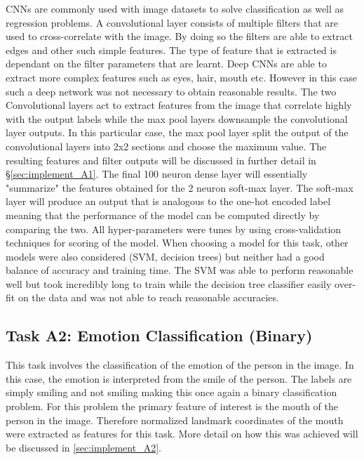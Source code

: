 \documentclass{article}
\begin{document}
		CNNs are commonly used with image datasets to solve classification as well as regression problems. A convolutional layer consists of multiple filters that are used to cross-correlate with the image. By doing so the filters are able to extract edges and other such simple features. The type of feature that is extracted is dependant on the filter parameters that are learnt. Deep CNNs are able to extract more complex features such as eyes, hair, mouth etc. However in this case such a deep network was not necessary to obtain reasonable results. The two Convolutional layers act to extract features from the image that correlate highly with the output labels while the max pool layers downsample the convolutional layer outputs. In this particular case, the max pool layer split the output of the convolutional layers into 2x2 sections and choose the maximum value. The resulting features and filter outputs will be discussed in further detail in \S \ref{sec:implement_A1}. The final 100 neuron dense layer will essentially "summarize" the features obtained for the 2 neuron soft-max layer. The soft-max layer will produce an output that is analogous to the one-hot encoded label meaning that the performance of the model can be computed directly by comparing the two. All hyper-parameters were tunes by using cross-validation techniques for scoring of the model. When choosing a model for this task, other models were also considered (SVM, decision trees) but neither had a good balance of accuracy and training time. The SVM was able to perform reasonable well but took incredibly long to train while the decision tree classifier easily over-fit on the data and was not able to reach reasonable accuracies.
    
    \subsection{Task A2: Emotion Classification (Binary)}
    \label{sec:desc_A2}
    
    	This task involves the classification of the emotion of the person in the image. In this case, the emotion is interpreted from the smile of the person. The labels are simply smiling and not smiling making this once again a binary classification problem. For this problem the primary feature of interest is the mouth of the person in the image. Therefore normalized landmark coordinates of the mouth were extracted as features for this task. More detail on how this was achieved will be discussed in \ref{sec:implement_A2}.
    	\\
    	
\end{document}
